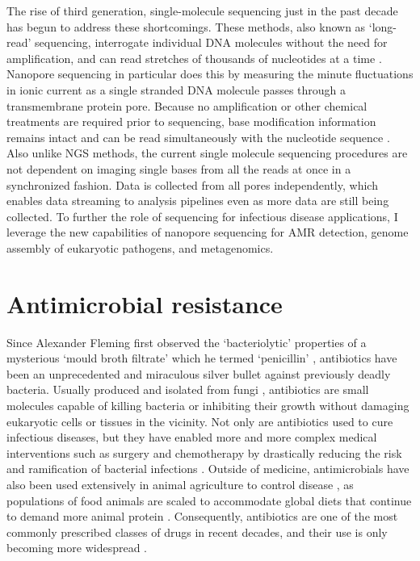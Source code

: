 The rise of third generation, single-molecule sequencing just in the past decade has begun to address these shortcomings. These methods, also known as ‘long-read’ sequencing, interrogate individual DNA molecules without the need for amplification, and can read stretches of thousands of nucleotides at a time \citep{Jain2018-qp}. Nanopore sequencing in particular does this by measuring the minute fluctuations in ionic current as a single stranded DNA molecule passes through a transmembrane protein pore. Because no amplification or other chemical treatments are required prior to sequencing, base modification information remains intact and can be read simultaneously with the nucleotide sequence \citep{Simpson2017-wb, mcintyre2019single}. Also unlike NGS methods, the current single molecule sequencing procedures are not dependent on imaging single bases from all the reads at once in a synchronized fashion. Data is collected from all pores independently, which enables data streaming to analysis pipelines even as more data are still being collected. To further the role of sequencing for infectious disease applications, I leverage the new capabilities of nanopore sequencing for AMR detection, genome assembly of eukaryotic pathogens, and metagenomics.

\section{Antimicrobial resistance}
\label{sec:amr}
Since Alexander Fleming first observed the ‘bacteriolytic’ properties of a mysterious ‘mould broth filtrate’ which he termed ‘penicillin’ \citep{Fleming1929-cb}, antibiotics have been an unprecedented and miraculous silver bullet against previously deadly bacteria. Usually produced and isolated from fungi \citep{Martinez2008-cf}, antibiotics are small molecules capable of killing bacteria or inhibiting their growth without damaging eukaryotic cells or tissues in the vicinity. Not only are antibiotics used to cure infectious diseases, but they have enabled more and more complex medical interventions such as surgery and chemotherapy by drastically reducing the risk and ramification of bacterial infections \citep{Crofts2017-ni}. Outside of medicine, antimicrobials have also been used extensively in animal agriculture to control disease \citep{Aarestrup2015-zu}, as populations of food animals are scaled to accommodate global diets that continue to demand more animal protein \citep{Van_Boeckel2019-zl}. Consequently, antibiotics are one of the most commonly prescribed classes of drugs in recent decades, and their use is only becoming more widespread \citep{Van_Boeckel2014-io}.

